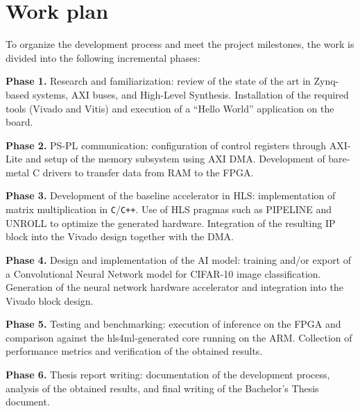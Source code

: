 \section*{Work plan}
To organize the development process and meet the project milestones, the work is divided
into the following incremental phases:

\textbf{Phase 1.} Research and familiarization: review of the state of the art in Zynq-based
systems, \ac{AXI} buses, and High-Level Synthesis. Installation of the required tools
(Vivado and Vitis) and execution of a ``Hello World'' application on the board.

\textbf{Phase 2.} \ac{PS}-\ac{PL} communication: configuration of control registers
through \ac{AXI}-Lite and
setup of the memory subsystem using \ac{AXI} \ac{DMA}. Development of bare-metal C drivers to
transfer data from \ac{RAM} to the \ac{FPGA}.

\textbf{Phase 3.} Development of the baseline accelerator in \ac{HLS}: implementation of matrix
multiplication in \texttt{C}/\texttt{C++}. Use of \ac{HLS} pragmas such as PIPELINE and
UNROLL to optimize
the generated hardware. Integration of the resulting \ac{IP} block into the Vivado design
together with the \ac{DMA}.

\textbf{Phase 4.} Design and implementation of the \ac{AI} model: training and/or export of a
Convolutional Neural Network model for \ac{CIFAR}-10 image classification. Generation of
the neural network hardware accelerator and integration into the Vivado block design.

\textbf{Phase 5.} Testing and benchmarking: execution of inference on the \ac{FPGA} and comparison
against the hls4ml-generated core running on the \ac{ARM}. Collection of performance metrics
and verification of the obtained results.

\textbf{Phase 6.} Thesis report writing: documentation of the development process, analysis of
the obtained results, and final writing of the Bachelor's Thesis document.
